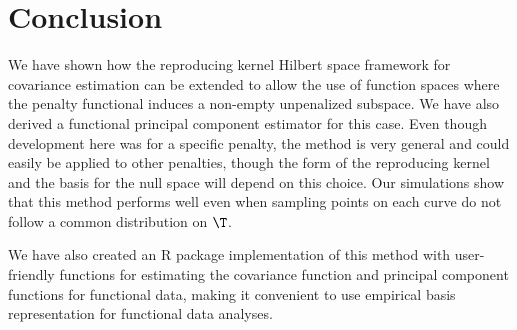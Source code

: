 \section{Conclusion} \label{ch2:discussion}

We have shown how the reproducing kernel Hilbert space framework for covariance estimation can be extended to allow the use of function spaces where the penalty functional induces a non-empty unpenalized subspace. We have also derived a functional principal component estimator for this case. Even though development here was for a specific penalty, the method is very general and could easily be applied to other penalties, though the form of the reproducing kernel and the basis for the null space will depend on this choice. Our simulations show that this method performs well even when sampling points on each curve do not follow a common distribution on $\T$. 

We have also created an R package implementation of this method with user-friendly functions for estimating the covariance function and principal component functions for functional data, making it convenient to use empirical basis representation for functional data analyses. 



